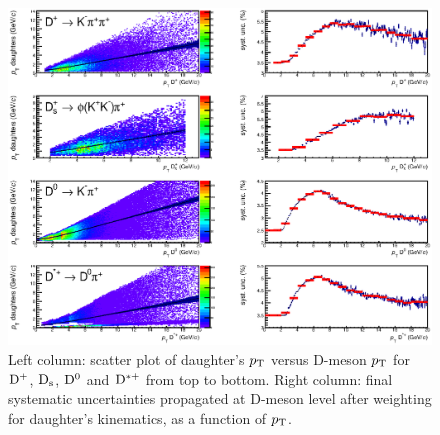 \begin{figure}[!htb]
\begin{center}
\includegraphics[width=1\textwidth]{FigCap4/FinalSystMEDmesons_ppPass4.eps}
\caption{Left column: scatter plot of daughter's $p_{\rm T}$ versus D-meson $p_{\rm T}$ for ${\rm D^+}$, ${\rm D_s}$, ${\rm D^0}$ and ${\rm D^{*+}}$ from top to bottom. Right column: final systematic uncertainties propagated at D-meson level after weighting for daughter's kinematics, as a function of $p_{\rm T}$.}
\label{fig:SysMatchEffDmeson}
\end{center}
\end{figure}

